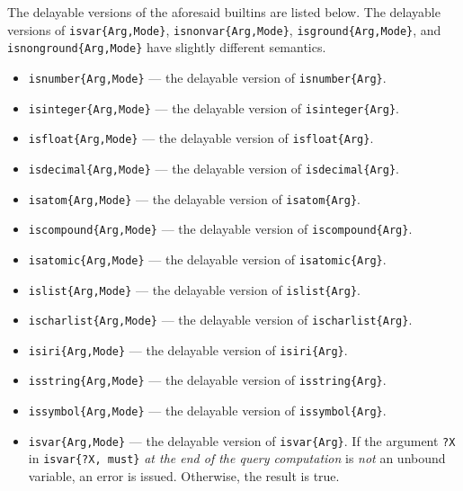 \documentclass[11pt]{article}
\begin{document}
The delayable versions of the aforesaid builtins are listed below. The
delayable versions of
\texttt{isvar\{Arg,Mode\}}, \texttt{isnonvar\{Arg,Mode\}},
\texttt{isground\{Arg,Mode\}}, and
\texttt{isnonground\{Arg,Mode\}} have slightly different semantics.
\begin{itemize}
\item \texttt{isnumber\{Arg,Mode\}} --- the delayable version of
  \texttt{isnumber\{Arg\}}.
\item \texttt{isinteger\{Arg,Mode\}} --- the delayable version of
  \texttt{isinteger\{Arg\}}.
\item \texttt{isfloat\{Arg,Mode\}} --- the delayable version of
  \texttt{isfloat\{Arg\}}.
\item \texttt{isdecimal\{Arg,Mode\}} --- the delayable version of
  \texttt{isdecimal\{Arg\}}.
\item \texttt{isatom\{Arg,Mode\}} --- the delayable version of
  \texttt{isatom\{Arg\}}.
\item \texttt{iscompound\{Arg,Mode\}} --- the delayable version of
  \texttt{iscompound\{Arg\}}.
\item \texttt{isatomic\{Arg,Mode\}} --- the delayable version of
  \texttt{isatomic\{Arg\}}.
\item \texttt{islist\{Arg,Mode\}} --- the delayable version of
  \texttt{islist\{Arg\}}.
\item \texttt{ischarlist\{Arg,Mode\}} --- the delayable version of
  \texttt{ischarlist\{Arg\}}.
\item \texttt{isiri\{Arg,Mode\}} --- the delayable version of
  \texttt{isiri\{Arg\}}.
\item \texttt{isstring\{Arg,Mode\}} --- the delayable version of
  \texttt{isstring\{Arg\}}.
\item \texttt{issymbol\{Arg,Mode\}} --- the delayable version of
  \texttt{issymbol\{Arg\}}.
\item \texttt{isvar\{Arg,Mode\}} --- the delayable version of
  \texttt{isvar\{Arg\}}.
  If the argument \texttt{?X} in \texttt{isvar\{?X, must\}} \emph{at the end of
  the query computation} is \emph{not} an unbound
  variable, an error is issued. Otherwise, the result is true.

\end{itemize}
\end{document}
